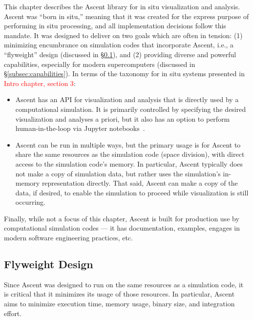 \documentclass[graybox]{svmult}
\newenvironment{tightItemize}{
        \begin{itemize}
                \setlength{\itemsep}{1pt}
                \setlength{\parskip}{0pt}
                \setlength{\parsep}{0pt}
        }{\end{itemize}
}
\newcommand{\fix}[1]{\textcolor{red}{#1}} %
\begin{document}
This chapter describes the Ascent library for in situ visualization
and analysis.
%
Ascent was ``born in situ,'' meaning that it was created for the
express purpose of performing in situ processing, and all implementation
decisions follow this mandate.
%
It was designed to deliver on two goals which are often in tension:
 (1) minimizing encumbrance on simulation codes that incorporate Ascent,
i.e., a ``flyweight'' design (discussed in \S\ref{sec:flyweight}), and
(2) providing diverse and powerful capabilities,
especially for modern supercomputers (discussed in \S\ref{subsec:capabilities}).
%
In terms of the taxonomy for in situ systems presented in \fix{Intro chapter, section 3}:
\begin{tightItemize}
\item Ascent has an API for visualization and analysis that is directly
used by a computational simulation.  It is primarily controlled by
specifying the desired visualization and analyses a priori, but it
also has an option to perform human-in-the-loop via Jupyter notebooks~\cite{CyrusISAV}.
\item Ascent can be run in multiple ways, but the primary usage is for
Ascent to share the same resources as the simulation code (space division),
with direct access to the simulation code's memory.  In particular,
Ascent typically does not make a copy of simulation data, but rather
uses the simulation's in-memory representation directly.
That said, Ascent can make a copy of the data, if desired, 
to enable the simulation to proceed while visualization is still occurring.
\end{tightItemize}
Finally,  while not a focus of this chapter, Ascent is built for production use by computational
simulation codes --- it has documentation,
examples, engages in modern software engineering practices, etc.

\subsection{Flyweight Design}
\label{sec:flyweight}

Since Ascent was designed to run on the same resources as a simulation code,
it is critical that it minimizes its usage of those resources.
%
In particular, Ascent aims to minimize
execution time, memory usage, binary size, and integration effort.
\end{document}
